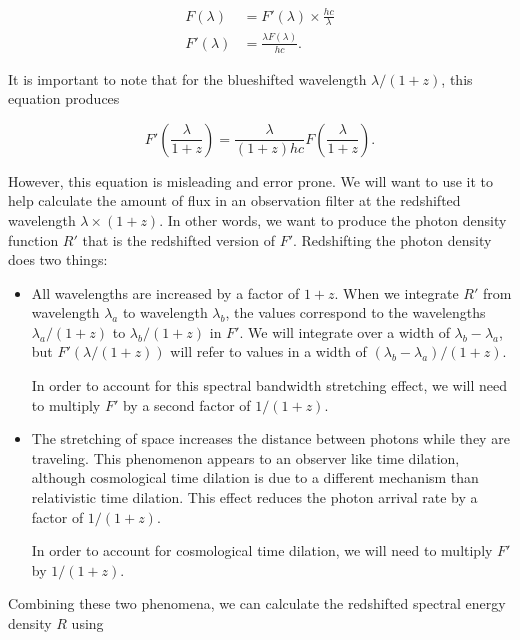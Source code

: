 \documentclass[linenumbers]{aastex631}
\begin{document}
\begin{equation}
\begin{aligned}
   F(\lambda) &= F'(\lambda) \times \frac{hc}{\lambda} \\
  F'(\lambda) &= \frac{\lambda F(\lambda)}{hc}.
\end{aligned}
\end{equation}

It is important to note that for the blueshifted wavelength $\lambda / (1+z)$,
this equation produces

\begin{equation}
 F'\left(\frac{\lambda}{1+z}\right) = \frac{\lambda}{(1+z)hc} F\left(\frac{\lambda}{1+z}\right).
\end{equation}

\noindent However, this equation is misleading and error prone. We will want to use it to
help calculate the amount of flux in an observation filter at the redshifted
wavelength $\lambda \times (1 + z)$. In other words, we want to produce the
photon density function $R'$ that is the redshifted version of $F'$.
Redshifting the photon density does two things:

\begin{itemize}
  \item All wavelengths are increased by a factor of $1 + z$. When we integrate
  $R'$ from wavelength $\lambda_a$ to wavelength $\lambda_b$, the values
  correspond to the wavelengths $\lambda_a / (1+z)$ to $\lambda_b / (1+z)$ in
  $F'$. We will integrate over a width of $\lambda_b - \lambda_a$, but
  $F'(\lambda / (1+z))$ will refer to values in a width of
  $(\lambda_b - \lambda_a) / (1+z)$.

  In order to account for this spectral bandwidth stretching effect, we will need
  to multiply $F'$ by a second factor of $1/(1+z)$.
  \item The stretching of space increases the distance between photons while
  they are traveling. This phenomenon appears to an observer like time
  dilation, although cosmological time dilation is due to a different mechanism
  than relativistic time dilation. This effect reduces the photon arrival rate
  by a factor of $1/(1+z)$.

  In order to account for cosmological time dilation, we will need to multiply
  $F'$ by $1/(1+z)$.
\end{itemize}

Combining these two phenomena, we can calculate the redshifted spectral energy
density $R$ using
\end{document}
